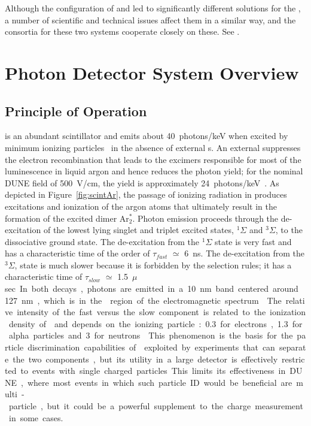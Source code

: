 Although the configuration of \single and \dual {} led to significantly different solutions for the , a number of scientific and technical issues affect them in a similar way, and the consortia for these two systems cooperate closely on these. See \dpchpds.



\section{Photon Detector System Overview}
\label{sec:fdsp-pd-overview}


\subsection{Principle of Operation}
\lar is  an abundant scintillator and emits about \SI{40}{photons/keV} when excited by minimum ionizing particles~\cite{Doke:1990rza} in the absence of external \efield{}s.
An external \efield{} suppresses the electron recombination that leads to the excimers responsible for most of the  luminescence in liquid argon and hence reduces the photon yield; for the nominal DUNE  field of \SI{500}{V/cm}, the yield is approximately \SI{24}{photons/keV}~\cite{PhysRevB.20.3486}. 
As depicted in Figure~\ref{fig:scintAr}, the passage of ionizing radiation in \lar produces excitations and ionization of the argon atoms that ultimately result in the formation of the excited dimer Ar$^*_2$.  
Photon emission proceeds through the de-excitation of the lowest lying singlet and triplet excited states, $^{1}\Sigma$ and 
$^{3}\Sigma$, to the dissociative ground state. The de-excitation from the $^{1}\Sigma$ state is very fast and has a characteristic time of the order of $\tau_{fast}$ $\simeq$ \SI{6}{ns}. The de-excitation from the $^{3}\Sigma$, state is much slower because it is forbidden by the selection rules; it has a characteristic time of $\tau_{slow}$ $\simeq$ \SI{1.5}{$\mu$sec}. %
In both decays, photons are emitted in a \SI{10}{nm} band centered around \SI{127}{nm}, which is in the  region of the electromagnetic spectrum~\cite{Heindl:2010zz}.
The relative intensity of the fast versus the slow component is related to the ionization density of \lar and depends on the ionizing particle: \num{0.3} for electrons, \num{1.3} for alpha particles and \num{3} for neutrons~\cite{PhysRevB.27.5279}. 
This phenomenon is the basis for the particle discrimination capabilities of \lar exploited by experiments that can separate the two components, but its utility in a large detector is effectively restricted to events with single charged particles. This %
limits its effectiveness in DUNE, where most events in which such particle ID would be beneficial are multi-particle, but it could be a powerful supplement to the charge measurement in some cases.

